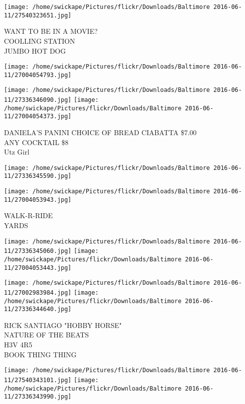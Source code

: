 \documentclass[10pt,letterpaper]{article}
\begin{document}
\vspace{0.25in}
\texttt{[image: /home/swickape/Pictures/flickr/Downloads/Baltimore 2016-06-11/27540323651.jpg]}

WANT TO BE IN A MOVIE?\\
COOLLING STATION\\
JUMBO HOT DOG\\
\pagebreak

\texttt{[image: /home/swickape/Pictures/flickr/Downloads/Baltimore 2016-06-11/27004054793.jpg]}

\vspace{0.25in}
\texttt{[image: /home/swickape/Pictures/flickr/Downloads/Baltimore 2016-06-11/27336346090.jpg]}
\texttt{[image: /home/swickape/Pictures/flickr/Downloads/Baltimore 2016-06-11/27004054373.jpg]}

DANIELA'S PANINI CHOICE OF BREAD CIABATTA \$7.00\\
ANY COCKTAIL \$8\\
Utz Girl\\
\pagebreak

\texttt{[image: /home/swickape/Pictures/flickr/Downloads/Baltimore 2016-06-11/27336345590.jpg]}

\vspace{0.25in}
\texttt{[image: /home/swickape/Pictures/flickr/Downloads/Baltimore 2016-06-11/27004053943.jpg]}

WALK{-}R{-}RIDE\\
YARDS\\
\pagebreak

\texttt{[image: /home/swickape/Pictures/flickr/Downloads/Baltimore 2016-06-11/27336345060.jpg]}
\texttt{[image: /home/swickape/Pictures/flickr/Downloads/Baltimore 2016-06-11/27004053443.jpg]}

\texttt{[image: /home/swickape/Pictures/flickr/Downloads/Baltimore 2016-06-11/27002983984.jpg]}
\texttt{[image: /home/swickape/Pictures/flickr/Downloads/Baltimore 2016-06-11/27336344640.jpg]}

RICK SANTIAGO "HOBBY HORSE"\\
NATURE OF THE BEATS\\
H3V 4R5\\
BOOK THING THING\\
\pagebreak

\texttt{[image: /home/swickape/Pictures/flickr/Downloads/Baltimore 2016-06-11/27540343101.jpg]}
\texttt{[image: /home/swickape/Pictures/flickr/Downloads/Baltimore 2016-06-11/27336343990.jpg]}
\end{document}
